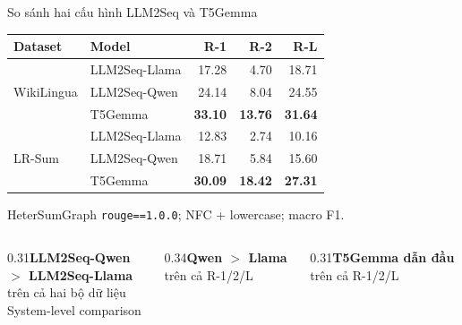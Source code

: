\documentclass[aspectratio=169,11pt]{beamer}
\begin{document}
\begin{frame}{So sánh hai cấu hình LLM2Seq và T5Gemma}
  \centering
  \small
  \setlength{\tabcolsep}{5pt}\renewcommand{\arraystretch}{1.08}
  \begin{tabular}{llrrr}
    \toprule Dataset & Model & R-1 & R-2 & R-L \\ \midrule
    \multirow{3}{*}{WikiLingua} & LLM2Seq-Llama & 17.28 & 4.70 & 18.71 \\
    & \cellcolor{LLMBlue!35}LLM2Seq-Qwen & \cellcolor{LLMBlue!35}24.14 & \cellcolor{LLMBlue!35}8.04 & \cellcolor{LLMBlue!35}24.55 \\
    & \cellcolor{LLMGreen!35}T5Gemma & \cellcolor{LLMGreen!35}\textbf{33.10} & \cellcolor{LLMGreen!35}\textbf{13.76} & \cellcolor{LLMGreen!35}\textbf{31.64} \\ \midrule
    \multirow{3}{*}{LR-Sum} & LLM2Seq-Llama & 12.83 & 2.74 & 10.16 \\
    & \cellcolor{LLMBlue!35}LLM2Seq-Qwen & \cellcolor{LLMBlue!35}18.71 & \cellcolor{LLMBlue!35}5.84 & \cellcolor{LLMBlue!35}15.60 \\
    & \cellcolor{LLMGreen!35}T5Gemma & \cellcolor{LLMGreen!35}\textbf{30.09} & \cellcolor{LLMGreen!35}\textbf{18.42} & \cellcolor{LLMGreen!35}\textbf{27.31} \\ \bottomrule
  \end{tabular}

  \vspace{0.35em}
  \scriptsize HeterSumGraph \texttt{rouge==1.0.0}; NFC + lowercase; macro F1.

  \vfill
  \begin{columns}[T,onlytextwidth]
    \begin{column}{0.31\textwidth}\centering\scriptsize\textbf{LLM2Seq-Qwen}\\[-0.15em]\textbf{$>$ LLM2Seq-Llama}\\trên cả hai bộ dữ liệu\\{\scriptsize\color{blue!65!black}System-level comparison}\end{column}
    \begin{column}{0.34\textwidth}\centering\small\textbf{Qwen $>$ Llama}\\ trên cả R-1/2/L\end{column}
    \begin{column}{0.31\textwidth}\centering\small\textbf{T5Gemma dẫn đầu}\\ trên cả R-1/2/L\end{column}
  \end{columns}
\end{frame}
\end{document}
